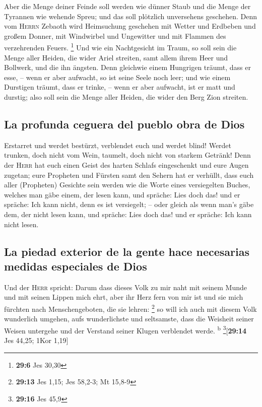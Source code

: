  Aber die Menge deiner Feinde soll werden wie dünner Staub
und die Menge der Tyrannen wie wehende Spreu; und das soll plötzlich
unversehens geschehen.  Denn vom \textsc{Herrn} Zebaoth
wird Heimsuchung geschehen mit Wetter und Erdbeben und großem Donner,
mit Windwirbel und Ungewitter und mit Flammen des verzehrenden Feuers.
\footnote{\textbf{29:6} Jes 30,30}  Und wie ein
Nachtgesicht im Traum, so soll sein die Menge aller Heiden, die wider
Ariel streiten, samt allem ihrem Heer und Bollwerk, und die ihn ängsten.
 Denn gleichwie einem Hungrigen träumt, dass er esse, --
wenn er aber aufwacht, so ist seine Seele noch leer; und wie einem
Durstigen träumt, dass er trinke, -- wenn er aber aufwacht, ist er matt
und durstig; also soll sein die Menge aller Heiden, die wider den Berg
Zion streiten.

\hypertarget{la-profunda-ceguera-del-pueblo-obra-de-dios}{%
\subsection{La profunda ceguera del pueblo obra de
Dios}\label{la-profunda-ceguera-del-pueblo-obra-de-dios}}

 Erstarret und werdet bestürzt, verblendet euch und werdet
blind! Werdet trunken, doch nicht vom Wein, taumelt, doch nicht von
starkem Getränk!  Denn der \textsc{Herr} hat euch einen
Geist des harten Schlafs eingeschenkt und eure Augen zugetan; eure
Propheten und Fürsten samt den Sehern hat er verhüllt, 
dass euch aller (Propheten) Gesichte sein werden wie die Worte eines
versiegelten Buches, welches man gäbe einem, der lesen kann, und
spräche: Lies doch das! und er spräche: Ich kann nicht, denn es ist
versiegelt; --  oder gleich als wenn man's gäbe dem, der
nicht lesen kann, und spräche: Lies doch das! und er spräche: Ich kann
nicht lesen.

\hypertarget{la-piedad-exterior-de-la-gente-hace-necesarias-medidas-especiales-de-dios}{%
\subsection{La piedad exterior de la gente hace necesarias medidas
especiales de
Dios}\label{la-piedad-exterior-de-la-gente-hace-necesarias-medidas-especiales-de-dios}}

 Und der \textsc{Herr} spricht: Darum dass dieses Volk zu
mir naht mit seinem Munde und mit seinen Lippen mich ehrt, aber ihr Herz
fern von mir ist und sie mich fürchten nach Menschengeboten, die sie
lehren: \footnote{\textbf{29:13} Jes 1,15; Jes 58,2-3; Mt 15,8-9}
 so will ich auch mit diesem Volk wunderlich umgehen,
aufs wunderlichste und seltsamste, dass die Weisheit seiner Weisen
untergehe und der Verstand seiner Klugen verblendet werde.
\textsuperscript{b} \footnote{\textbf{29:16} Jes 45,9}{[}\textbf{29:14}
Jes 44,25; 1Kor 1,19{]}

